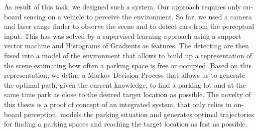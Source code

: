     As result of this task, we designed such a system. Our approach requires
    only on-board sensing on a vehicle to perceive the environment. So far, we
    used a camera and laser range finder to observe the scene and to detect
    cars from the perceptual input. This has was solved by a supervised
    learning approach using a support vector machine and Histograms of
    Gradients  as features. The detecting are then fused into a model of the
    environment that allows to build up a representation of the scene
    estimating how often a parking space is free or occupied.  Based on this
    representation, we define a Markov Decision Process that allows us to
    generate the optimal path, given the current knowledge, to find a parking
    lot and at the same time park as close to the desired target location as
    possible. The novelty of this thesis is a proof of concept of an
    integrated system, that only relies in on-board perception, models the
    parking situation and generates optimal trajectories for finding a parking
    spaces and reaching the target location as fast as possible.


